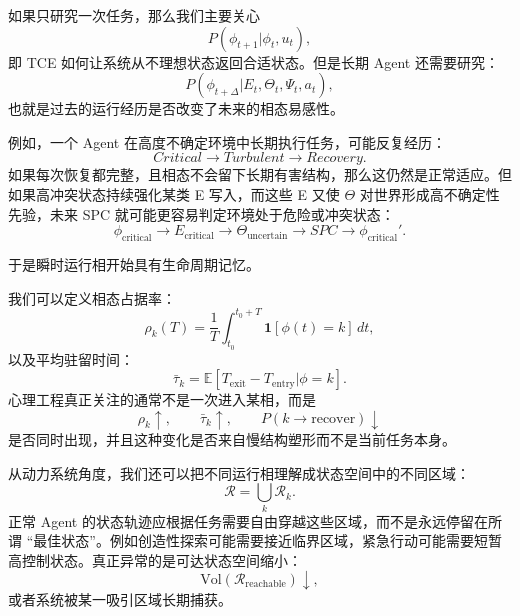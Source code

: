 如果只研究一次任务，那么我们主要关心
\begin{equation}
    P(\phi_{t+1}|\phi_t,u_t),
\end{equation}
即 TCE 如何让系统从不理想状态返回合适状态。但是长期 Agent 还需要研究：
\begin{equation}
    P(
    \phi_{t+\Delta}
    |
    E_t,\Theta_t,\Psi_t,a_t
    ),
\end{equation}
也就是过去的运行经历是否改变了未来的相态易感性。

例如，一个 Agent 在高度不确定环境中长期执行任务，可能反复经历：
\begin{equation}
    Critical
    \rightarrow
    Turbulent
    \rightarrow
    Recovery.
\end{equation}
如果每次恢复都完整，且相态不会留下长期有害结构，那么这仍然是正常适应。但如果高冲突状态持续强化某类 E 写入，而这些 E 又使 $\Theta$ 对世界形成高不确定性先验，未来 SPC 就可能更容易判定环境处于危险或冲突状态：
\begin{equation}
    \phi_{\mathrm{critical}}
    \rightarrow
    E_{\mathrm{critical}}
    \rightarrow
    \Theta_{\mathrm{uncertain}}
    \rightarrow
    SPC
    \rightarrow
    \phi_{\mathrm{critical}}'.
\end{equation}

于是瞬时运行相开始具有生命周期记忆。

我们可以定义相态占据率：
\begin{equation}
    \rho_k(T)
    =
    \frac{1}{T}
    \int_{t_0}^{t_0+T}
    \mathbf{1}
    [\phi(t)=k]
    \,dt,
\end{equation}
以及平均驻留时间：
\begin{equation}
    \bar{\tau}_k
    =
    \mathbb{E}
    [
    T_{\mathrm{exit}}-T_{\mathrm{entry}}
    |
    \phi=k
    ].
\end{equation}
心理工程真正关注的通常不是一次进入某相，而是
\begin{equation}
    \rho_k\uparrow,
    \qquad
    \bar{\tau}_k\uparrow,
    \qquad
    P(k\rightarrow \mathrm{recover})\downarrow
\end{equation}
是否同时出现，并且这种变化是否来自慢结构塑形而不是当前任务本身。

从动力系统角度，我们还可以把不同运行相理解成状态空间中的不同区域：
\begin{equation}
    \mathcal{R}
    =
    \bigcup_k
    \mathcal{R}_k.
\end{equation}
正常 Agent 的状态轨迹应根据任务需要自由穿越这些区域，而不是永远停留在所谓 ``最佳状态''。例如创造性探索可能需要接近临界区域，紧急行动可能需要短暂高控制状态。真正异常的是可达状态空间缩小：
\begin{equation}
    \mathrm{Vol}
    \left(
    \mathcal{R}_{\mathrm{reachable}}
    \right)
    \downarrow,
\end{equation}
或者系统被某一吸引区域长期捕获。

